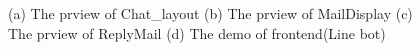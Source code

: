 \documentclass{article}
\begin{document}
\begin{figure}[htb]
\begin{center}
      \caption{(a) The prview of Chat\_layout 
      (b) The prview of MailDisplay
      (c) The prview of ReplyMail
      (d) The demo of frontend(Line bot)}
      \label{fig:linebot_msg}
  \end{center}
  \vspace{-\baselineskip}
\end{figure}
\end{document}
